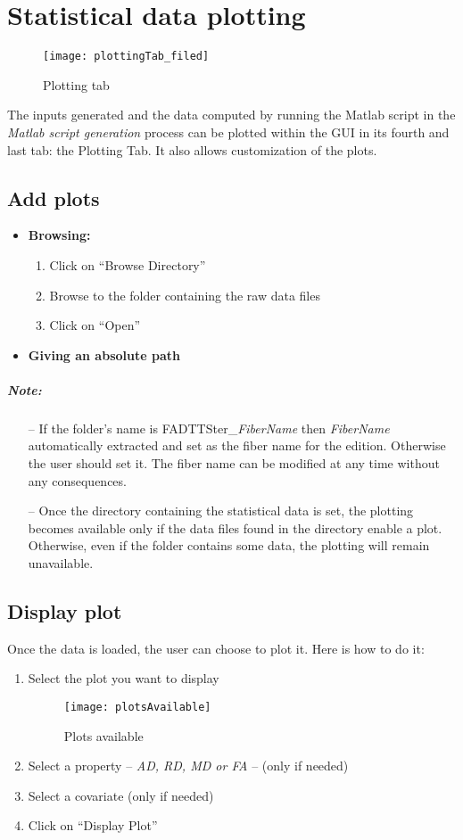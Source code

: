 \documentclass[fadttsterUserGuide_use]{subfiles}
\begin{document}
	\section{Statistical data plotting}
	\begin{figure}[H]
  		\texttt{[image: plottingTab\_filed]}
  		\caption{Plotting tab}
    	\label{fig:plottingTab_filed}
	\end{figure}
	The inputs generated and the data computed by running the Matlab script in the \textit{Matlab script generation} process can be plotted within the GUI in its fourth and last tab: the Plotting Tab.
It also allows customization of the plots.	
	\vfill
	\newpage
	
	\subsection{Add plots}
	\begin{itemize}
		\item \textbf{Browsing:}
		\begin{enumerate}
			\item Click on ``Browse Directory''
			\item Browse to the folder containing the raw data files
			\item Click on ``Open''
		\end{enumerate}	
		\item \textbf{Giving an absolute path}
	\end{itemize}
	\subparagraph{\textbf{Note:}}
	\begin{itemize}
		\item[--] If the folder's name is FADTTSter\_\textit{FiberName} then \textit{FiberName} automatically extracted and set as the fiber name for the edition. Otherwise the user should set it. The fiber name can be modified at any time without any consequences.
		\item[--] Once the directory containing the statistical data is set, the plotting becomes available only if the data files found in the directory enable a plot. Otherwise, even if the folder contains some data, the plotting will remain unavailable.
	\end{itemize}
	\subsection{Display plot}
	Once the data is loaded, the user can choose to plot it. Here is how to do it:
	\begin{enumerate}
			\item Select the plot you want to display
			\begin{figure}[H]
  				\texttt{[image: plotsAvailable]}
  				\caption{Plots available}
    			\label{fig:plotsAvailable}
			\end{figure}
			\item Select a property -- \textit{AD, RD, MD or FA} -- (only if needed)
			\item Select a covariate (only if needed)
			\item Click on ``Display Plot''
	\end{enumerate}
	\vfill
	\newpage
	
\end{document}
